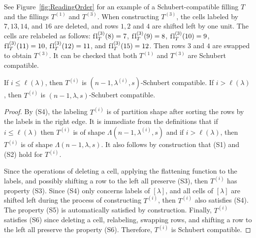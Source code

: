\documentclass[12pt]{amsart}
\newcommand{\la}{\lambda}
\newcommand{\fl}{\mathrm{f\hspace{0.25pt}l}}
\begin{document}
See Figure~\ref{fig:ReadingOrder} for an example of a Schubert-compatible filling $T$ and the fillings $T^{(1)}$ and $T^{(3)}$. When constructing $T^{(3)}$, the cells labeled by $7,13,14$, and $16$ are deleted, and rows $1,2$ and $4$ are shifted left by one unit. The cells are relabeled as follows: $\fl_T^{(3)}(8)=7$, $\fl_T^{(3)}(9) = 8$, $\fl_T^{(3)}(10) = 9$, $\fl_T^{(3)}(11)=10$, $\fl_T^{(3)}(12) = 11$, and $\fl_T^{(3)}(15)=12$. Then rows $3$ and $4$ are swapped to obtain $T^{(3)}$. It can be checked that both $T^{(1)}$ and $T^{(3)}$ are  Schubert compatible.

\begin{lemma}
If $i \leq \ell(\lambda)$, then $T^{(i)}$ is $(n-1,\lambda^{(i)},s)$-Schubert compatible. If $i > \ell(\lambda)$, then $T^{(i)}$ is $(n-1,\lambda,s)$-Schubert compatible.
\end{lemma}

\begin{proof}
By (S4), the labeling $T^{(i)}$ is of partition shape after sorting the rows by the labels in the right edge. It is immediate from the definitions that if $i\leq \ell(\la)$ then $T^{(i)}$ is of shape $\Lambda(n-1,\la^{(i)},s)$ and if $i> \ell(\la)$, then $T^{(i)}$ is of shape $\Lambda(n-1,\la,s)$. It also follows by construction that (S1) and (S2) hold for $T^{(i)}$.

Since the operations of deleting a cell, applying the flattening function to the labels, and possibly shifting a row to the left all preserve (S3), then $T^{(i)}$ has property (S3). Since (S4) only concerns labels of $[\lambda]$, and all cells of $[\lambda]$ are shifted left during the process of constructing $T^{(i)}$, then $T^{(i)}$ also satisfies (S4). The property (S5) is automatically satisfied by construction. Finally, $T^{(i)}$ satisfies (S6) since deleting a cell, relabeling, swapping rows, and shifting a row to the left all preserve the property (S6). Therefore, $T^{(i)}$ is Schubert compatible. 
\end{proof}
\end{document}
